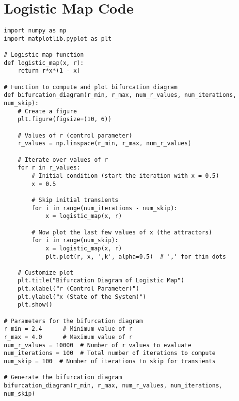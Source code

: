\documentclass{amsbook}
\begin{document}
\section{Logistic Map Code}
\begin{verbatim}
import numpy as np
import matplotlib.pyplot as plt

# Logistic map function
def logistic_map(x, r):
    return r*x*(1 - x)

# Function to compute and plot bifurcation diagram
def bifurcation_diagram(r_min, r_max, num_r_values, num_iterations, num_skip):
    # Create a figure
    plt.figure(figsize=(10, 6))
    
    # Values of r (control parameter)
    r_values = np.linspace(r_min, r_max, num_r_values)
    
    # Iterate over values of r
    for r in r_values:
        # Initial condition (start the iteration with x = 0.5)
        x = 0.5
        
        # Skip initial transients
        for i in range(num_iterations - num_skip):
            x = logistic_map(x, r)
        
        # Now plot the last few values of x (the attractors)
        for i in range(num_skip):
            x = logistic_map(x, r)
            plt.plot(r, x, ',k', alpha=0.5)  # ',' for thin dots
    
    # Customize plot
    plt.title("Bifurcation Diagram of Logistic Map")
    plt.xlabel("r (Control Parameter)")
    plt.ylabel("x (State of the System)")
    plt.show()

# Parameters for the bifurcation diagram
r_min = 2.4      # Minimum value of r
r_max = 4.0      # Maximum value of r
num_r_values = 10000  # Number of r values to evaluate
num_iterations = 100  # Total number of iterations to compute
num_skip = 100  # Number of iterations to skip for transients

# Generate the bifurcation diagram
bifurcation_diagram(r_min, r_max, num_r_values, num_iterations, num_skip)
\end{verbatim}



\cite{strogatz1994nonlinear}
\cite{wiggins2003introduction}
\cite{sprotta2020variants}
\end{document}
